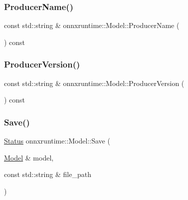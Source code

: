 \subsubsection{\texorpdfstring{Producer\+Name()}{ProducerName()}}
{\footnotesize\ttfamily const std\+::string \& onnxruntime\+::\+Model\+::\+Producer\+Name (\begin{DoxyParamCaption}{ }\end{DoxyParamCaption}) const}

\mbox{\label{classonnxruntime_1_1Model_a798ddae9a5f6322fa34e2e8b5f2bd9fe}} 
\subsubsection{\texorpdfstring{Producer\+Version()}{ProducerVersion()}}
{\footnotesize\ttfamily const std\+::string \& onnxruntime\+::\+Model\+::\+Producer\+Version (\begin{DoxyParamCaption}{ }\end{DoxyParamCaption}) const}

\mbox{\label{classonnxruntime_1_1Model_a9fc3f53be6d48631d4e97add2381abf5}} 
\subsubsection{\texorpdfstring{Save()}{Save()}\hspace{0.1cm}{\footnotesize\ttfamily [1/2]}}
{\footnotesize\ttfamily \mbox{\hyperlink{classonnxruntime_1_1common_1_1Status}{Status}} onnxruntime\+::\+Model\+::\+Save (\begin{DoxyParamCaption}\item[{\mbox{\hyperlink{classonnxruntime_1_1Model}{Model}} \&}]{model,  }\item[{const std\+::string \&}]{file\+\_\+path }\end{DoxyParamCaption})\hspace{0.3cm}{\ttfamily [static]}}

\mbox{\label{classonnxruntime_1_1Model_a9ce245a1c4fa29450c37a5ffab2743c7}} 
